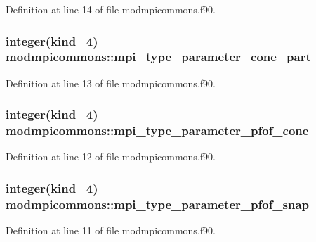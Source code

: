 Definition at line 14 of file modmpicommons.\+f90.

\subsubsection[{\texorpdfstring{mpi\+\_\+type\+\_\+parameter\+\_\+cone\+\_\+part}{mpi_type_parameter_cone_part}}]{\setlength{\rightskip}{0pt plus 5cm}integer(kind=4) modmpicommons\+::mpi\+\_\+type\+\_\+parameter\+\_\+cone\+\_\+part}\hypertarget{namespacemodmpicommons_a0aa6354f5e5b7ccf30b1a8039a39fbef}{}\label{namespacemodmpicommons_a0aa6354f5e5b7ccf30b1a8039a39fbef}


Definition at line 13 of file modmpicommons.\+f90.

\subsubsection[{\texorpdfstring{mpi\+\_\+type\+\_\+parameter\+\_\+pfof\+\_\+cone}{mpi_type_parameter_pfof_cone}}]{\setlength{\rightskip}{0pt plus 5cm}integer(kind=4) modmpicommons\+::mpi\+\_\+type\+\_\+parameter\+\_\+pfof\+\_\+cone}\hypertarget{namespacemodmpicommons_a5fc1e7c8e04f9a9c5f7e0e07a5141c8d}{}\label{namespacemodmpicommons_a5fc1e7c8e04f9a9c5f7e0e07a5141c8d}


Definition at line 12 of file modmpicommons.\+f90.

\subsubsection[{\texorpdfstring{mpi\+\_\+type\+\_\+parameter\+\_\+pfof\+\_\+snap}{mpi_type_parameter_pfof_snap}}]{\setlength{\rightskip}{0pt plus 5cm}integer(kind=4) modmpicommons\+::mpi\+\_\+type\+\_\+parameter\+\_\+pfof\+\_\+snap}\hypertarget{namespacemodmpicommons_a330add7c6795d1bcbf3b4679fbe28db5}{}\label{namespacemodmpicommons_a330add7c6795d1bcbf3b4679fbe28db5}


Definition at line 11 of file modmpicommons.\+f90.

